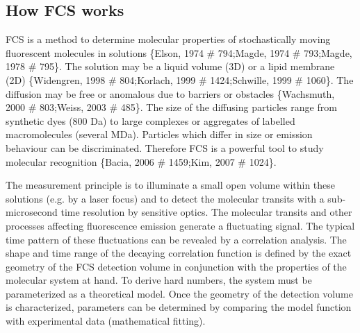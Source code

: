 \subsection{How FCS works}
\label{sec:theor.howfc}

FCS is a method to determine molecular properties of stochastically moving fluorescent molecules in solutions \{Elson, 1974 \# 794;Magde, 1974 \# 793;Magde, 1978 \# 795\}. The solution may be a liquid volume (3D) or a lipid membrane (2D) \{Widengren, 1998 \# 804;Korlach, 1999 \# 1424;Schwille, 1999 \# 1060\}. The diffusion may be free or anomalous due to barriers or obstacles \{Wachsmuth, 2000 \# 803;Weiss, 2003 \# 485\}. The size of the diffusing particles range from synthetic dyes (800 Da) to large complexes or aggregates of labelled macromolecules (several MDa). Particles which differ in size or emission behaviour can be discriminated. Therefore FCS is a powerful tool to study molecular recognition \{Bacia, 2006 \# 1459;Kim, 2007 \# 1024\}.

The measurement principle is to illuminate a small open volume within these solutions (e.g. by a laser focus) and to detect the molecular transits with a sub-microsecond time resolution by sensitive optics. The molecular transits and other processes affecting fluorescence emission generate a fluctuating signal. The typical time pattern of these fluctuations can be revealed by a correlation analysis. The shape and time range of the decaying correlation function is defined by the exact geometry of the FCS detection volume in conjunction with the properties of the molecular system at hand. To derive hard numbers, the system must be parameterized as a theoretical model. Once the geometry of the detection volume is characterized, parameters can be determined by comparing the model function with experimental data (mathematical fitting).


